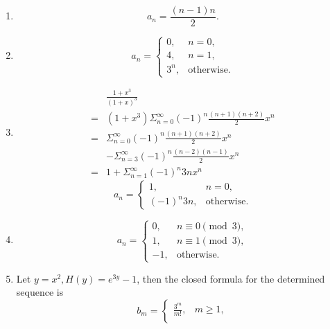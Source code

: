 \documentclass{../../cls/sig-alternate-05-2015}
\begin{document}
\begin{enumerate}
\begin{enumerate}
        \item \begin{equation}
            a_n = \frac{(n - 1)n}{2}.
        \end{equation}
        \item \begin{equation}
            a_n = \begin{cases}
                0, & n = 0,\\
                4, & n = 1,\\
                3^n, & \text{otherwise}.
            \end{cases}
        \end{equation}
        \item \begin{align}
            & \frac{1 + x^3}{(1 + x)^3}\\
            = & (1 + x^3) \Sigma_{n = 0}^\infty (-1)^n \frac{(n + 1)(n + 2)}{2} x^n\\
            = & \Sigma_{n = 0}^\infty (-1)^n \frac{(n + 1)(n + 2)}{2} x^n\\
            & - \Sigma_{n = 3}^\infty (-1)^n \frac{(n - 2)(n - 1)}{2} x^n\\
            = & 1 + \Sigma_{n = 1}^\infty (-1)^n 3n x^n
        \end{align}
        \begin{equation}
            a_n = \begin{cases}
            1, & n = 0,\\
            (-1)^n 3n, & \text{otherwise}.
            \end{cases}
        \end{equation}
        \item \begin{equation}
            a_n = \begin{cases}
                0, & n \equiv 0 \pmod{3},\\
                1, & n \equiv 1 \pmod{3},\\
                -1, & \text{otherwise}.
            \end{cases}
        \end{equation}
        \item Let $y = x^2, H(y) = e^{3y} - 1$, then the closed formula for the determined sequence is \begin{equation}
            b_m = \begin{cases}
            \frac{3^m}{m!}, & m \ge 1,\\

\end{cases}
\end{equation}
\end{enumerate}
\end{enumerate}
\end{document}
